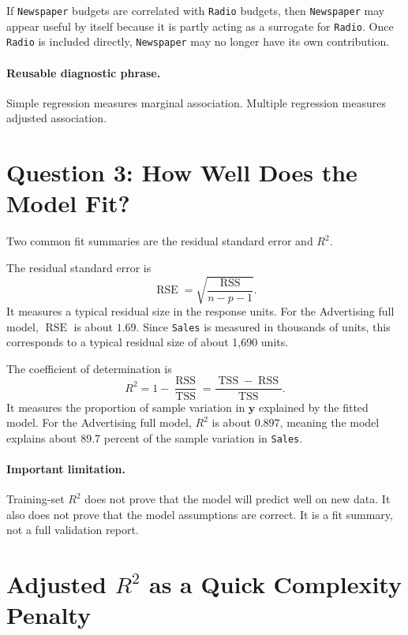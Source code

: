 If \texttt{Newspaper} budgets are correlated with \texttt{Radio} budgets, then \texttt{Newspaper} may appear useful by itself because it is partly acting as a surrogate for \texttt{Radio}.  Once \texttt{Radio} is included directly, \texttt{Newspaper} may no longer have its own contribution.

\paragraph{Reusable diagnostic phrase.}
Simple regression measures marginal association.  Multiple regression measures adjusted association.

\section{Question 3: How Well Does the Model Fit?}

Two common fit summaries are the residual standard error and \(R^2\).

The residual standard error is
\begin{equation}
  \operatorname{RSE}
  =\sqrt{\frac{\operatorname{RSS}}{n-p-1}}.
\end{equation}
It measures a typical residual size in the response units.  For the Advertising full model, \(\operatorname{RSE}\) is about \(1.69\).  Since \texttt{Sales} is measured in thousands of units, this corresponds to a typical residual size of about 1,690 units.

The coefficient of determination is
\begin{equation}
  R^2=1-\frac{\operatorname{RSS}}{\operatorname{TSS}}
  =\frac{\operatorname{TSS}-\operatorname{RSS}}{\operatorname{TSS}}.
\end{equation}
It measures the proportion of sample variation in \(\mathbf{y}\) explained by the fitted model.  For the Advertising full model, \(R^2\) is about \(0.897\), meaning the model explains about 89.7 percent of the sample variation in \texttt{Sales}.

\paragraph{Important limitation.}
Training-set \(R^2\) does not prove that the model will predict well on new data.  It also does not prove that the model assumptions are correct.  It is a fit summary, not a full validation report.

\section{Adjusted \texorpdfstring{\(R^2\)}{R2} as a Quick Complexity Penalty}

